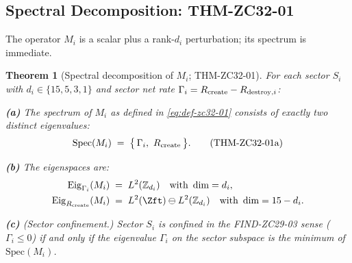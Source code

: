 \documentclass[12pt, a4paper]{article}
\newtheorem{theorem}{Theorem}[section]
\begin{document}
\subsection{Spectral Decomposition: THM-ZC32-01}
\label{sec:thm-zc32-01}

The operator $M_i$ is a scalar plus a rank-$d_i$
perturbation; its spectrum is immediate.

\begin{theorem}[Spectral decomposition of $M_i$; THM-ZC32-01]
\label{thm:zc32-01}
For each sector $S_i$ with $d_i \in \{15, 5, 3, 1\}$ and
sector net rate $\Gamma_i = R_{\rm create} -
R_{{\rm destroy},i}$:

\textbf{(a)} The spectrum of $M_i$ as defined in
\eqref{eq:def-zc32-01} consists of exactly two distinct
eigenvalues:
\begin{equation}
  \mathrm{Spec}(M_i) \;=\;
    \bigl\{\,\Gamma_i,\ R_{\rm create}\,\bigr\}.
  \tag{THM-ZC32-01a}\label{eq:thm-zc32-01a}
\end{equation}

\textbf{(b)} The eigenspaces are:
\begin{align*}
  \mathrm{Eig}_{\Gamma_i}(M_i)
    &\;=\; L^2(\mathbb{Z}_{d_i})
    \quad\text{with}\ \dim = d_i,\\
  \mathrm{Eig}_{R_{\rm create}}(M_i)
    &\;=\; L^2(\Zft) \ominus L^2(\mathbb{Z}_{d_i})
    \quad\text{with}\ \dim = 15 - d_i.
\end{align*}

\textbf{(c)} (Sector confinement.) Sector $S_i$ is confined
in the FIND-ZC29-03 sense ($\Gamma_i \leq 0$) if and only if
the eigenvalue $\Gamma_i$ on the sector subspace is the
minimum of $\mathrm{Spec}(M_i)$.
\end{theorem}
\end{document}

